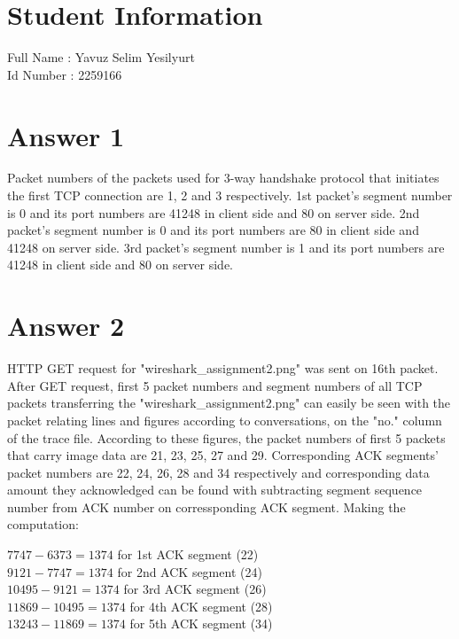 \documentclass[10pt]{article}
\begin{document}
\section*{Student Information } 
Full Name : Yavuz Selim Yesilyurt \\
Id Number : 2259166 \\

\section*{Answer 1}
\hspace{4mm}	
Packet numbers of the packets used for 3-way handshake protocol that initiates the first TCP connection are 1, 2 and 3 respectively. 1st packet's segment number is 0 and its port numbers are 41248 in client side and 80 on server side. 2nd packet's segment number is 0 and its port numbers are 80 in client side and 41248 on server side. 3rd packet's segment number is 1 and its port numbers are 41248 in client side and 80 on server side.

\section*{Answer 2}
\hspace{4mm}	
HTTP GET request for "wireshark\_assignment2.png" was sent on 16th packet. After GET request, first 5 packet numbers and segment numbers of all TCP packets transferring the "wireshark\_assignment2.png" can easily be seen with the packet relating lines and figures according to conversations, on the "no." column of the trace file. According to these figures, the packet numbers of first 5 packets that carry image data are 21, 23, 25, 27 and 29. Corresponding ACK segments' packet numbers are 22, 24, 26, 28 and 34 respectively and corresponding data amount they acknowledged can be found with subtracting segment sequence number from ACK number on corressponding ACK segment. Making the computation:

\begin{center}
$7747 - 6373 = 1374$ for 1st ACK segment (22) \\
$9121 - 7747= 1374$ for 2nd ACK segment (24) \\
$10495 - 9121 = 1374$ for 3rd ACK segment (26) \\
$11869 - 10495 = 1374$ for 4th ACK segment (28) \\
$13243 - 11869 = 1374$ for 5th ACK segment (34) \\
\end{center}
\end{document}
